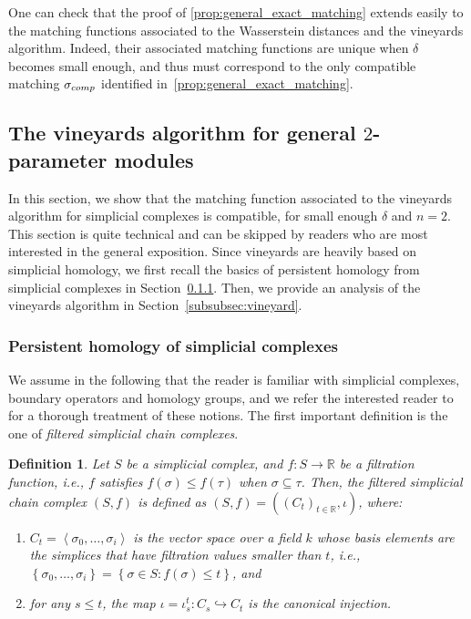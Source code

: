 \documentclass{article}
\newcommand{\matching}{\sigma}
\newcommand{\R}{\mathbb{R}}
\newtheorem{definition}{Definition}%
\newcommand{\rebuttal}[1]{{ #1}}
\begin{document}
\rebuttal{One can check that the proof of \cref{prop:general_exact_matching} extends easily to the matching functions associated to the Wasserstein distances and the vineyards algorithm. Indeed, their associated matching functions are unique when $\delta$ becomes small enough, and thus must correspond to the only compatible matching $\matching_{\rm comp}$ identified in~\cref{prop:general_exact_matching}.}


\subsection{The vineyards algorithm for general $2$-parameter modules}\label{subsec:vineyards}
In this section, we show that the matching function associated to the vineyards
algorithm for simplicial complexes is compatible, for small enough $\delta$ and $n=2$. %
This section is quite technical and can be skipped by readers who are most interested in the general exposition.
Since vineyards are heavily based on simplicial homology,
we first recall the basics of persistent homology from simplicial complexes in Section~\ref{subsubsec:simplicial_homology}.
Then, we provide an analysis of the
vineyards algorithm in Section~\ref{subsubsec:vineyard}.

\subsubsection{Persistent homology of simplicial complexes}\label{subsubsec:simplicial_homology}

We assume in the following that the reader is familiar with simplicial complexes, boundary operators and homology groups, and we refer
the interested reader to~\cite[Chapter 1]{munkresElementsAlgebraicTopology1984} for a thorough treatment of these notions.
The first important definition is the one of {\em filtered simplicial chain complexes}. \\


\begin{definition}
	Let $S$ be a simplicial complex, and $f\colon S \to \R$ be a {\em filtration function}, i.e., $f$ satisfies
	$f(\sigma) \le f( \tau)$ when $\sigma \subseteq \tau$.
	Then, the {\em filtered simplicial chain complex} $(S,f)$ is defined as
	$(S,f) = ((C_t)_{t\in \R}, \iota)$, where:
	\begin{enumerate}
		\item $C_t = \left< \sigma_0,\dots, \sigma_i\right>$ is the vector space over a field $k$ whose basis elements are the simplices that have filtration values smaller than $t$, i.e.,
			$ \left\{ \sigma_0,\dots, \sigma_i\right\} = \left\{ \sigma\in S: f(\sigma) \le t\right\}$, and
		\item for any $s\le t$, the map $\iota = \iota_s^t \colon C_s \hookrightarrow C_t$ is the canonical injection. \\
	\end{enumerate}
\end{definition}
\end{document}
